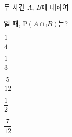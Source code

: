 두 사건 $A$, $B$에 대하여\par\smallskip{}\par\smallskip\noindent 일 때, $\mathrm{P}(A\cap\comp{B})$는?
\begin{choicesii}{\rule[-3ex]{0pt}{8ex}$\dfrac{1}{4}$}{\rule[-3ex]{0pt}{8ex}$\dfrac{1}{3}$}{\rule[-3ex]{0pt}{8ex}$\dfrac{5}{12}$}{\rule[-3ex]{0pt}{8ex}$\dfrac{1}{2}$}{\rule[-3ex]{0pt}{8ex}$\dfrac{7}{12}$}\end{choicesii}
